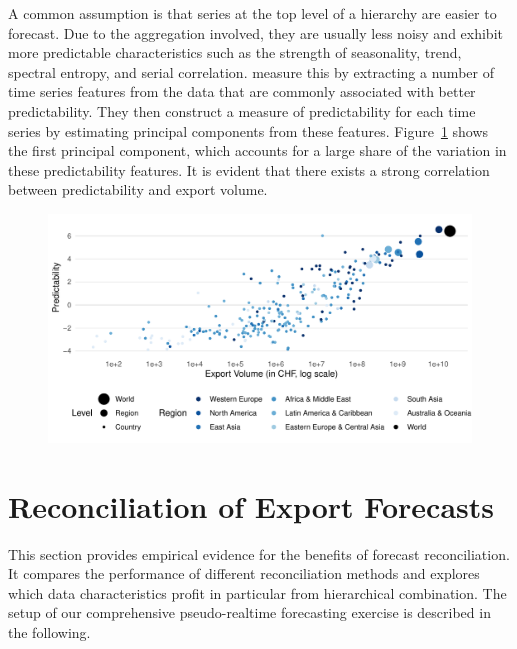 \documentclass[a4paper,fleqn,11pt]{article}
\begin{document}
A common assumption is that series at the top level of a hierarchy are easier to forecast. Due to the aggregation involved, they are usually less noisy and exhibit more predictable characteristics such as the strength of seasonality, trend, spectral entropy, and serial correlation. \cite{Kang2017} measure this by extracting a number of time series features from the data that are commonly associated with better predictability. They then construct a measure of predictability for each time series by estimating principal components from these features. Figure~\ref{fig:feature} shows the first principal component, which accounts for a large share of the variation in these predictability features. It is evident that there exists a strong correlation between predictability and export volume.

\begin{figure}[H]
	\includegraphics[width=\textwidth]{fig/fig_confetti}
	\label{fig:feature}
\end{figure}


\section{Reconciliation of Export Forecasts}\label{sec:appl}

This section provides empirical evidence for the benefits of forecast reconciliation. It compares the performance of different reconciliation methods and explores which data characteristics profit in particular from hierarchical combination. The setup of our comprehensive pseudo-realtime forecasting exercise is described in the following.
\end{document}
